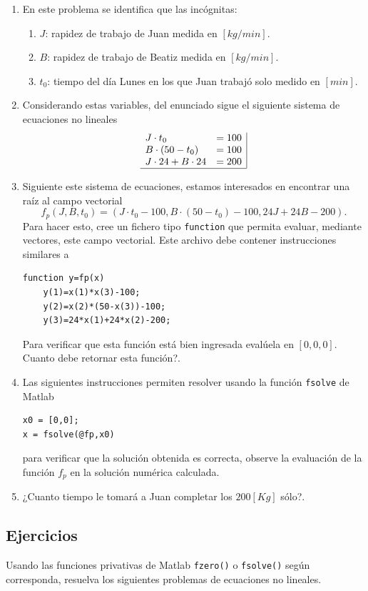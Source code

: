 \documentclass[letter,11pt]{article}
\newcommand\0{\mathbf{0}}
\newcommand{\matlab}{{\sc Matlab} }
\begin{document}
\begin{enumerate}
\begin{enumerate}
\item En este problema se identifica que las inc\'ognitas:
\begin{enumerate}
\item $J$: rapidez de trabajo de Juan medida en $[kg/min]$.
\item $B$: rapidez de trabajo de Beatiz medida en $[kg/min]$.
\item $t_0$:  tiempo del d\'ia Lunes en los que Juan trabaj\'o solo medido en $[min]$.
\end{enumerate}
\item Considerando estas variables, del enunciado sigue el siguiente sistema de ecuaciones no lineales
$$
\begin{array}{lr|}
J\cdot t_0	&=100\\
B\cdot(50-t_0)	&=100\\
J\cdot 24 + B\cdot 24 &=200\\
\hline
\end{array}
$$
\item Siguiente este sistema de ecuaciones, estamos interesados en encontrar una ra\'iz al campo vectorial
$$
f_p(J,B,t_0)=(J\cdot t_0-100, B\cdot(50-t_0)-100, 24J+24B-200).
$$
Para hacer esto, cree un fichero tipo \texttt{function} que permita evaluar, mediante vectores, este campo vectorial. Este archivo debe contener instrucciones similares a
\begin{lstlisting}
function y=fp(x)
	y(1)=x(1)*x(3)-100;
	y(2)=x(2)*(50-x(3))-100;
	y(3)=24*x(1)+24*x(2)-200;
\end{lstlisting}
Para verificar que esta funci\'on est\'a bien ingresada eval\'uela en $[0,0,0]$. \textquestiondown Cuanto debe retornar esta funci\'on?.

\item Las siguientes instrucciones permiten resolver usando la funci\'on \texttt{fsolve} de  \matlab
\begin{lstlisting}
x0 = [0,0];
x = fsolve(@fp,x0)
\end{lstlisting}
para verificar que la soluci\'on obtenida es correcta, observe la evaluaci\'on de la funci\'on $f_p$ en la soluci\'on num\'erica calculada.
\item ¿Cuanto tiempo le tomar\'a a Juan completar los $200[Kg]$ s\'olo?.
\end{enumerate}

\end{enumerate}
	
\subsection{Ejercicios}
Usando las funciones privativas de \matlab \texttt{fzero()} o \texttt{fsolve()} seg\'un corresponda, resuelva los siguientes problemas de ecuaciones no lineales.
\end{document}
